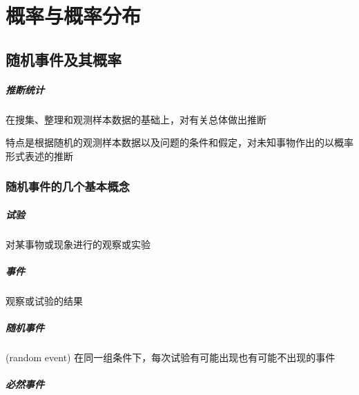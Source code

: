 \documentclass[UTF8,10pt]{book}
\begin{document}



\clearpage
\chapter{概率与概率分布}


    \section{随机事件及其概率}
        \paragraph{推断统计} 在搜集、整理和观测样本数据的基础上，对有关总体做出推断

        {\kaishu 特点是根据随机的观测样本数据以及问题的条件和假定，对未知事物作出的以概率形式表述的推断}

        \subsection{随机事件的几个基本概念}
            \paragraph{试验} 对某事物或现象进行的观察或实验

            \paragraph{事件} 观察或试验的结果

            \paragraph{随机事件} (random event) 在同一组条件下，每次试验有可能出现也有可能不出现的事件

            \paragraph{必然事件}
\end{document}
